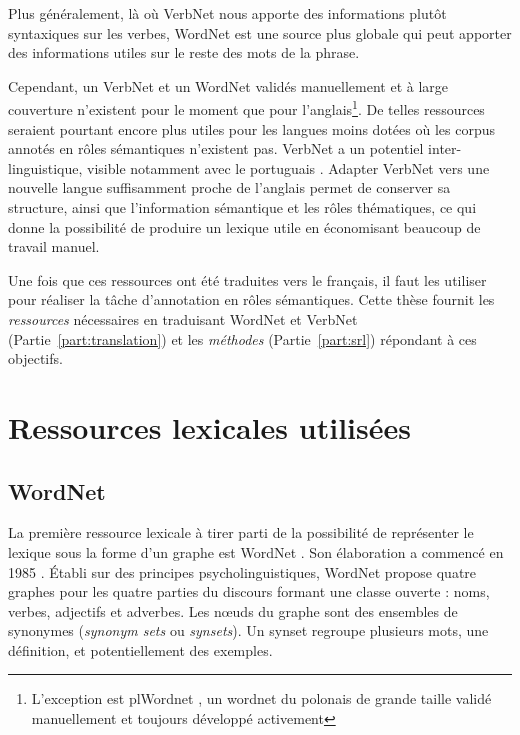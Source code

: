 Plus généralement, là où VerbNet nous apporte des informations plutôt
syntaxiques sur les verbes, WordNet est une source plus globale qui peut
apporter des informations utiles sur le reste des mots de la phrase.

Cependant, un VerbNet et un WordNet validés manuellement et à large couverture
n'existent pour le moment que pour l'anglais\footnote{L'exception est plWordnet
\citep{maziarz2012approaching}, un wordnet du polonais de grande taille validé
manuellement et toujours développé activement}. De telles ressources seraient
pourtant encore plus utiles pour les langues moins dotées où les corpus annotés
en rôles sémantiques n'existent pas.  VerbNet a un potentiel
inter-linguistique, visible notamment avec le portuguais \citep[section
2.2.2]{kipperschuler2005verbnet}. Adapter VerbNet vers une nouvelle langue
suffisamment proche de l'anglais permet de conserver sa structure, ainsi que
l'information sémantique et les rôles thématiques, ce qui donne la possibilité
de produire un lexique utile en économisant beaucoup de travail manuel.

Une fois que ces ressources ont été traduites vers le français, il faut les
utiliser pour réaliser la tâche d'annotation en rôles sémantiques. Cette thèse
fournit les \textit{ressources} nécessaires en traduisant WordNet et VerbNet
(Partie~\ref{part:translation}) et les \textit{méthodes} (Partie~\ref{part:srl})
répondant à ces objectifs.

\section{Ressources lexicales utilisées}
\label{ressources_utilisees}

\subsection{WordNet}
\label{presentation_wordnet}

La première ressource lexicale à tirer parti de la possibilité de représenter
le lexique sous la forme d'un graphe est WordNet \citep{fellbaum1998wordnet}.
Son élaboration a commencé en 1985 \citep{miller1990introduction}. Établi sur
des principes psycholinguistiques, WordNet propose quatre graphes pour les
quatre parties du discours formant une classe ouverte : noms, verbes,
adjectifs et adverbes. Les nœuds du graphe sont des ensembles de synonymes
(\textit{synonym sets} ou \textit{synsets}). Un synset regroupe plusieurs mots, une
définition, et potentiellement des exemples.

